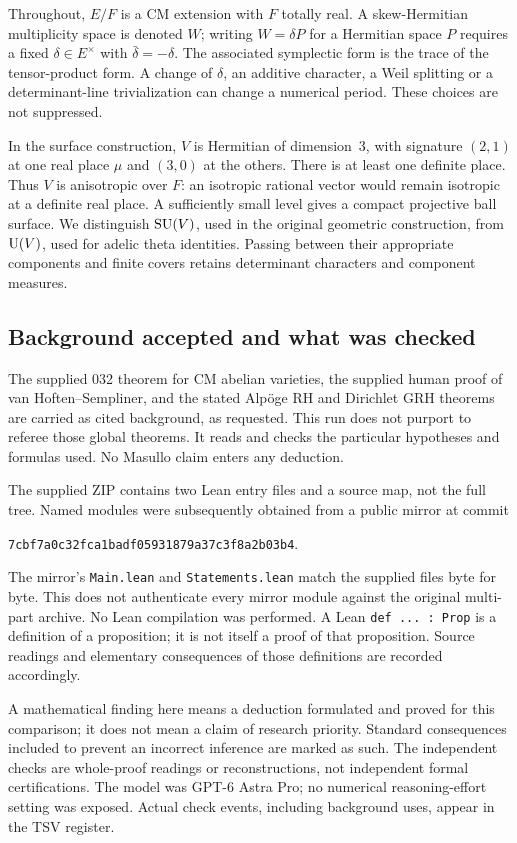 \documentclass[11pt]{article}
\theoremstyle{definition}\newtheorem{definition}[theorem]{Definition}\newtheorem{remark}[theorem]{Remark}
\begin{document}
Throughout, $E/F$ is a CM extension with $F$ totally real. A skew-Hermitian multiplicity space is denoted $W$; writing $W=\delta P$ for a Hermitian space $P$ requires a fixed $\delta\in E^\times$ with $\bar\delta=-\delta$. The associated symplectic form is the trace of the tensor-product form. A change of $\delta$, an additive character, a Weil splitting or a determinant-line trivialization can change a numerical period. These choices are not suppressed.

In the surface construction, $V$ is Hermitian of dimension~3, with signature $(2,1)$ at one real place $\mu$ and $(3,0)$ at the others. There is at least one definite place. Thus $V$ is anisotropic over $F$: an isotropic rational vector would remain isotropic at a definite real place. A sufficiently small level gives a compact projective ball surface. We distinguish $\operatorname{SU}(V)$, used in the original geometric construction, from $\operatorname{U}(V)$, used for adelic theta identities. Passing between their appropriate components and finite covers retains determinant characters and component measures.

\subsection{Background accepted and what was checked}
The supplied 032 theorem for CM abelian varieties, the supplied human proof of van Hoften--Sempliner, and the stated Alp\"oge RH and Dirichlet GRH theorems are carried as cited background, as requested. This run does not purport to referee those global theorems. It reads and checks the particular hypotheses and formulas used. No Masullo claim enters any deduction.

The supplied ZIP contains two Lean entry files and a source map, not the full tree. Named modules were subsequently obtained from a public mirror at commit
\begin{center}\small\nolinkurl{7cbf7a0c32fca1badf05931879a37c3f8a2b03b4}.\end{center}
The mirror's \texttt{Main.lean} and \texttt{Statements.lean} match the supplied files byte for byte. This does not authenticate every mirror module against the original multi-part archive. No Lean compilation was performed. A Lean \texttt{def ... : Prop} is a definition of a proposition; it is not itself a proof of that proposition. Source readings and elementary consequences of those definitions are recorded accordingly.

A mathematical finding here means a deduction formulated and proved for this comparison; it does not mean a claim of research priority. Standard consequences included to prevent an incorrect inference are marked as such. The independent checks are whole-proof readings or reconstructions, not independent formal certifications. The model was GPT-6 Astra Pro; no numerical reasoning-effort setting was exposed. Actual check events, including background uses, appear in the TSV register.
\end{document}
